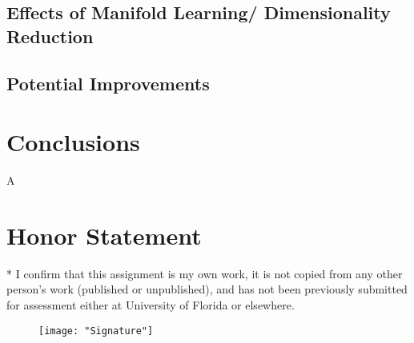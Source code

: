 \documentclass[conference]{IEEEtran}
\begin{document}
\subsection{Effects of Manifold Learning/ Dimensionality Reduction}


\subsection{Potential Improvements}



\section{Conclusions} \label{Conclusions}
A

\section*{Honor Statement}
\noindent
* I confirm that this assignment is my own work, it is not copied from any other person's work (published or unpublished), and has not been previously submitted for assessment either at University of Florida or elsewhere.

\begin{figure}[h!]
	\centering
	\texttt{[image: "Signature"]}
\end{figure}


\newpage



%
\end{document}
